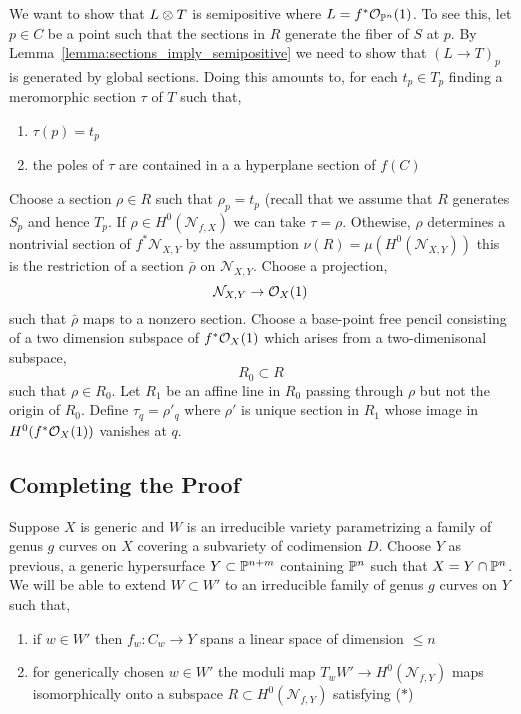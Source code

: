 \documentclass[12pt]{article}
\newcommand{\cN}{\mathcal{N}}
\begin{document}
We want to show that $L \ot T$ is semipositive where $L = f^* \struct{\P^n}(1)$. To see this, let $p \in C$ be a point such that the sections in $R$ generate the fiber of $S$ at $p$. By Lemma~\ref{lemma:sections_imply_semipositive} we need to show that $(L \to T)_p$ is generated by global sections. Doing this amounts to, for each $t_p \in T_p$ finding a meromorphic section $\tau$ of $T$ such that,
\begin{enumerate}
\item $\tau(p) = t_p$
\item the poles of $\tau$ are contained in a a hyperplane section of $f(C)$
\end{enumerate}
Choose a section $\rho \in R$ such that $\rho_p = t_p$ (recall that we assume that $R$ generates $S_p$ and hence $T_p$. If $\rho \in H^0(\cN_{f, X})$ we can take $\tau = \rho$. Othewise, $\rho$ determines a nontrivial section of $f^* \cN_{X,Y}$ by the assumption $\nu(R) = \mu(H^0(\cN_{X,Y}))$ this is the restriction of a section $\bar{\rho}$ on $\cN_{X,Y}$. Choose a projection,
\[ \cN_{X,Y} \to \struct{X}(1) \]
such that $\bar{\rho}$ maps to a nonzero section. Choose a base-point free pencil consisting of a two dimension subspace of $f^* \struct{X}(1)$ which arises from a two-dimenisonal subspace,
\[ R_0 \subset R \]
such that $\rho \in R_0$. {\color{red} Let $R_1$ be an affine line in $R_0$ passing through $\rho$ but not the origin of $R_0$. Define $\tau_q = \rho'_q$ where $\rho'$ is unique section in $R_1$ whose image in $H^0(f^* \struct{X}(1))$ vanishes at $q$.}

\subsection{Completing the Proof}

Suppose $X$ is generic and $W$ is an irreducible variety parametrizing a family of genus $g$ curves on $X$ covering a subvariety of codimension $D$. Choose $Y$ as previous, a generic hypersurface $Y \subset \P^{n+m}$ containing $\P^n$ such that $X = Y \cap \P^n$. We will be able to extend $W \subset W'$ to an irreducible family of genus $g$ curves on $Y$ such that,
\begin{enumerate}
\item if $w \in W'$ then $f_w : C_w \to Y$ spans a linear space of dimension $\le n$
\item for generically chosen $w \in W'$ the moduli map $T_w W' \to H^0(\cN_{f, Y})$ maps isomorphically onto a subspace $R \subset H^0(\cN_{f, Y})$ satisfying ($\ast$)
\end{enumerate}
\end{document}
